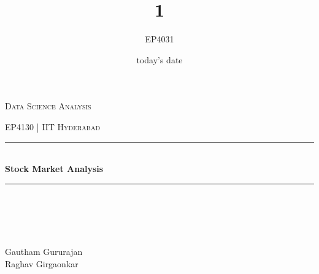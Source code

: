 \documentclass[12pt]{report}
\title{1}
\author{ EP4031}
\date{today's date}
\begin{document}

\begin{titlepage}
	\centering
    \vspace*{0.5 cm}
\begin{center}    \textsc{\Large   Data Science Analysis}\\[2.0 cm]	\end{center}
	\textsc{\Large EP4130 | IIT Hyderabad  }\\[0.5 cm]				%
	\rule{\linewidth}{0.2 mm} \\[0.4 cm]
	{ \huge \bfseries Stock Market Analysis}\\
	\rule{\linewidth}{0.2 mm} \\[1.5 cm]
	
	\begin{minipage}{0.4\textwidth}
		\begin{flushleft} \large
			\end{flushleft}
			\end{minipage}~
			\begin{minipage}{0.4\textwidth}
            
			\begin{flushright} \large
			\emph{} \\
                Gautham Gururajan \\ 
                Raghav Girgaonkar
		\end{flushright}
           
	\end{minipage}\\[2 cm]
	
    
    
    
    
	
\end{titlepage}


\tableofcontents
\pagebreak

\renewcommand{\thesection}{\arabic{section}}
\end{document}

